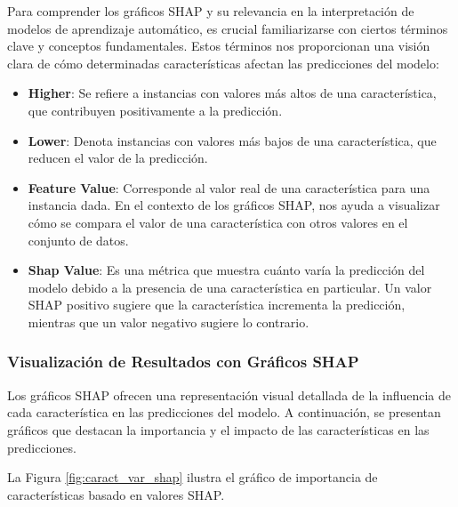 Para comprender los gráficos SHAP y su relevancia en la interpretación de modelos de aprendizaje automático, es crucial familiarizarse con ciertos términos clave y conceptos fundamentales. Estos términos nos proporcionan una visión clara de cómo determinadas características afectan las predicciones del modelo:

\begin{itemize}
    \item \textbf{Higher}: Se refiere a instancias con valores más altos de una característica, que contribuyen positivamente a la predicción.

    \item \textbf{Lower}: Denota instancias con valores más bajos de una característica, que reducen el valor de la predicción.

    \item \textbf{Feature Value}: Corresponde al valor real de una característica para una instancia dada. En el contexto de los gráficos SHAP, nos ayuda a visualizar cómo se compara el valor de una característica con otros valores en el conjunto de datos.

    \item \textbf{Shap Value}: Es una métrica que muestra cuánto varía la predicción del modelo debido a la presencia de una característica en particular. Un valor SHAP positivo sugiere que la característica incrementa la predicción, mientras que un valor negativo sugiere lo contrario.
\end{itemize}

\subsubsection{Visualización de Resultados con Gráficos SHAP}

Los gráficos SHAP ofrecen una representación visual detallada de la influencia de cada característica en las predicciones del modelo. A continuación, se presentan gráficos que destacan la importancia y el impacto de las características en las predicciones.

La Figura \ref{fig:caract_var_shap} ilustra el gráfico de importancia de características basado en valores SHAP.

